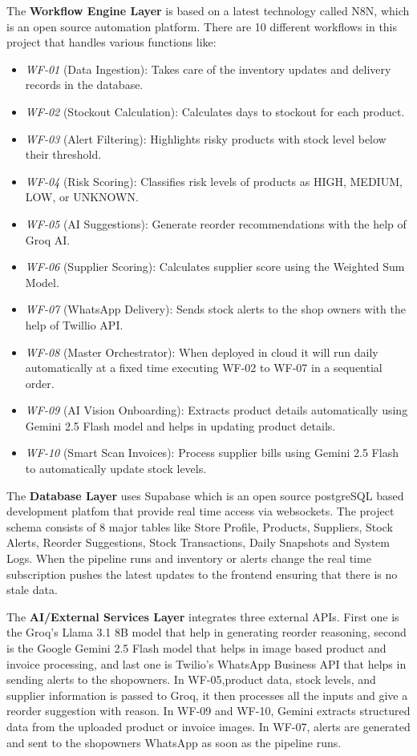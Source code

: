 \documentclass[journal]{IEEEtran}
\begin{document}
The \textbf{Workflow Engine Layer} is based on a latest technology called N8N, which is an open source automation platform. There are 10 different workflows in this project that handles various functions like:

\begin{itemize}
\item \textit{WF-01} (Data Ingestion): Takes care of the inventory updates and delivery records in the database.
\item \textit{WF-02} (Stockout Calculation): Calculates days to stockout for each product.
\item \textit{WF-03} (Alert Filtering): Highlights risky products with stock level below their threshold.
\item \textit{WF-04} (Risk Scoring): Classifies risk levels of products as HIGH, MEDIUM, LOW, or UNKNOWN.
\item \textit{WF-05} (AI Suggestions): Generate reorder recommendations with the help of Groq AI.
\item \textit{WF-06} (Supplier Scoring): Calculates supplier score using  the Weighted Sum Model.
\item \textit{WF-07} (WhatsApp Delivery): Sends stock alerts to the shop owners with the help of Twillio API.
\item \textit{WF-08} (Master Orchestrator): When deployed in cloud it will run daily automatically at a fixed time executing WF-02 to WF-07 in a sequential order.
\item \textit{WF-09} (AI Vision Onboarding): Extracts product details automatically using Gemini 2.5 Flash model and helps in updating product details.
\item \textit{WF-10} (Smart Scan Invoices): Process supplier bills using Gemini 2.5 Flash to automatically update stock levels.
\end{itemize}

The \textbf{Database Layer} uses Supabase which is an open source postgreSQL based development platfom that provide real time access via websockets. The project schema consists of 8 major tables like Store Profile, Products, Suppliers, Stock Alerts, Reorder Suggestions, Stock Transactions, Daily Snapshots and System Logs. When the pipeline runs and inventory or alerts change the real time subscription pushes the latest updates to the frontend ensuring that there is no stale data.

The \textbf{AI/External Services Layer} integrates three external APIs. First one is the Groq's Llama 3.1 8B model that help in generating reorder reasoning, second is the Google Gemini 2.5 Flash model that helps in image based product and invoice processing, and last one is Twilio's WhatsApp Business API that helps in sending alerts to the shopowners. In WF-05,product data, stock levels, and supplier information is passed to Groq, it then processes all the inputs and give a reorder suggestion with reason. In WF-09 and WF-10, Gemini extracts structured data from the uploaded product or invoice images. In WF-07, alerts are generated and sent to the shopowners WhatsApp as soon as the pipeline runs.
\end{document}
